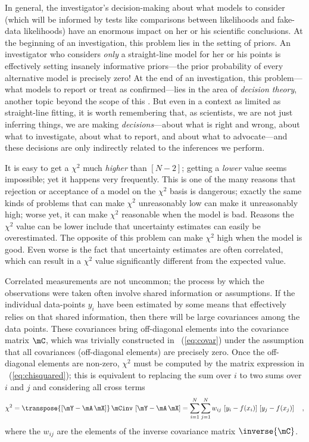 \documentclass[12pt,twoside,pdftex]{article}
\begin{document}
{  In general, the investigator's decision-making about what models to
  consider (which will be informed by tests like comparisons between
  likelihoods and fake-data likelihoods) have an enormous impact on
  her or his scientific conclusions.  At the beginning of an
  investigation, this problem lies in the setting of priors.  An
  investigator who considers \emph{only} a straight-line model for her
  or his points is effectively setting insanely informative
  priors---the prior probability of every alternative model is
  precisely zero!  At the end of an investigation, this problem---what
  models to report or treat as confirmed---lies in the area of
  \emph{decision theory}, another topic beyond the scope of this
  \documentname.  But even in a context as limited as straight-line
  fitting, it is worth remembering that, as scientists, we are not
  just inferring things, we are making \emph{decisions}---about what
  is right and wrong, about what to investigate, about what to report,
  and about what to advocate---and these decisions are only indirectly
  related to the inferences we perform.}

It is easy to get a $\chi^2$ much \emph{higher} than $[N-2]$; getting
a \emph{lower} value seems impossible; yet it happens very frequently.
This is one of the many reasons that rejection or acceptance of a
model on the $\chi^2$ basis is dangerous; exactly the same kinds of
problems that can make $\chi^2$ unreasonably low can make it
unreasonably high; worse yet, it can make $\chi^2$ reasonable when the
model is bad.  Reasons the $\chi^2$ value can be lower include that
uncertainty estimates can easily be overestimated. The opposite of
this problem can make $\chi^2$ high when the model is good. Even worse
is the fact that uncertainty estimates are often correlated, which can
result in a $\chi^2$ value significantly different from the expected
value.

Correlated measurements are not uncommon; the process by which the
observations were taken often involve shared information or
assumptions. If the individual data-points $y_i$ have been estimated
by some means that effectively relies on that shared information, then
there will be large covariances among the data points.  These
covariances bring off-diagonal elements into the covariance matrix
$\mC$, which was trivially constructed in
\equationname~(\ref{eq:covar}) under the assumption that all
covariances (off-diagonal elements) are precisely zero.  Once the
off-diagonal elements are non-zero, $\chi^2$ must be computed by the
matrix expression in \equationname~(\ref{eq:chisquared}); this is
equivalent to replacing the sum over $i$ to two sums over $i$ and $j$
and considering all cross terms
\begin{equation}
\chi^2 =
 \transpose{\left[\mY-\mA\,\mX\right]}\,\mCinv\,\left[\mY-\mA\,\mX\right]
 = \sum_{i=1}^N \sum_{j=1}^N
 w_{ij}\,\left[y_i-f(x_i)\right]\,\left[y_j-f(x_j)\right]
 \quad,
\end{equation} 
where the $w_{ij}$ are the elements of the inverse covariance
matrix $\inverse{\mC}$.
\end{document}
